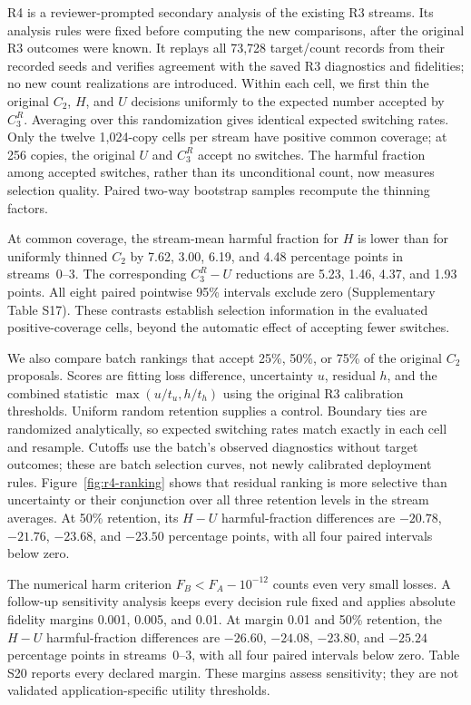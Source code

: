 \documentclass{iopjournal}
\begin{document}
R4 is a reviewer-prompted secondary analysis of the existing R3 streams.
Its analysis rules were fixed before computing the new comparisons, after
the original R3 outcomes were known.  It replays all 73,728 target/count
records from their recorded seeds and verifies agreement with the saved R3
diagnostics and fidelities; no new count realizations are introduced.
Within each cell, we first thin the original $C_2$, $H$, and $U$ decisions
uniformly to the expected number accepted by $C_3^R$.  Averaging over this
randomization gives identical expected switching rates.  Only the twelve
1,024-copy cells per stream have positive common coverage; at 256 copies,
the original $U$ and $C_3^R$ accept no switches.  The harmful fraction among
accepted switches, rather than its unconditional count, now measures selection
quality.  Paired two-way bootstrap samples recompute the thinning factors.

At common coverage, the stream-mean harmful fraction for $H$ is lower than
for uniformly thinned $C_2$ by 7.62, 3.00, 6.19, and 4.48 percentage points
in streams~0--3.  The corresponding $C_3^R-U$ reductions are 5.23, 1.46,
4.37, and 1.93 points.  All eight paired pointwise 95\% intervals exclude
zero (Supplementary Table S17).  These contrasts establish
selection information in the evaluated positive-coverage cells, beyond the
automatic effect of accepting fewer switches.

We also compare batch rankings that accept 25\%, 50\%, or 75\% of the
original $C_2$ proposals.  Scores are fitting loss difference, uncertainty
$u$, residual $h$, and the combined statistic
$\max(u/t_u,h/t_h)$ using the original R3 calibration thresholds.
Uniform random retention supplies a control.  Boundary ties are randomized
analytically, so expected switching rates match exactly in each cell and
resample.  Cutoffs use the batch's observed diagnostics without target
outcomes; these are batch selection curves, not newly calibrated deployment
rules.  Figure~\ref{fig:r4-ranking} shows that residual ranking is more
selective than uncertainty or their conjunction over all three retention
levels in the stream averages.  At 50\% retention, its $H-U$ harmful-fraction
differences are $-20.78$, $-21.76$, $-23.68$, and $-23.50$ percentage points,
with all four paired intervals below zero.

The numerical harm criterion $F_B<F_A-10^{-12}$ counts even very small
losses.  A follow-up sensitivity analysis keeps every decision rule fixed
and applies absolute fidelity margins 0.001, 0.005, and 0.01.
At margin 0.01 and 50\% retention, the $H-U$ harmful-fraction differences
are $-26.60$, $-24.08$, $-23.80$, and $-25.24$ percentage points in
streams~0--3, with all four paired intervals below zero.  Table S20 reports
every declared margin.  These margins assess sensitivity; they are not
validated application-specific utility thresholds.
\end{document}
